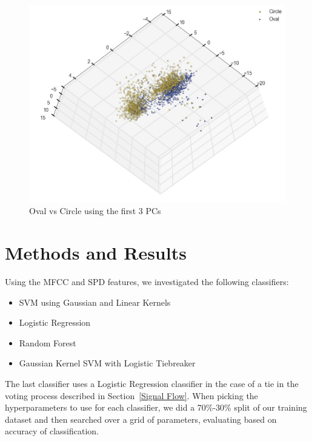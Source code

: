 \documentclass[journal]{IEEEtran}
\begin{document}
\begin{figure}[H]
\centering
\includegraphics[width=0.9\linewidth]{pca_oval_circle}
\caption{Oval vs Circle using the first 3 PCs}
\label{fig:pca_not_sep}
\end{figure}


\section{Methods and Results}
Using the MFCC and SPD features, we investigated the following classifiers:
\begin{itemize}
\item SVM using Gaussian and Linear Kernels
\item Logistic Regression
\item Random Forest
\item Gaussian Kernel SVM with Logistic Tiebreaker
\end{itemize} The last classifier uses a Logistic Regression classifier in the case of a tie in the voting process described in Section~\ref{Signal Flow}. When picking the hyperparameters to use for each classifier, we did a 70\%-30\% split of our training dataset and then searched over a grid of parameters, evaluating based on accuracy of classification.
\end{document}
